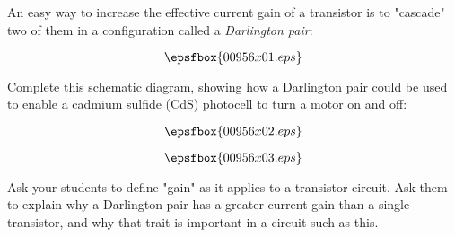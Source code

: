 

An easy way to increase the effective current gain of a transistor is to "cascade" two of them in a configuration called a {\it Darlington pair}:

$$\epsfbox{00956x01.eps}$$

\goodbreak

Complete this schematic diagram, showing how a Darlington pair could be used to enable a cadmium sulfide (CdS) photocell to turn a motor on and off:

\vskip 50pt

$$\epsfbox{00956x02.eps}$$

\vskip 50pt







$$\epsfbox{00956x03.eps}$$







Ask your students to define "gain" as it applies to a transistor circuit.  Ask them to explain why a Darlington pair has a greater current gain than a single transistor, and why that trait is important in a circuit such as this.




